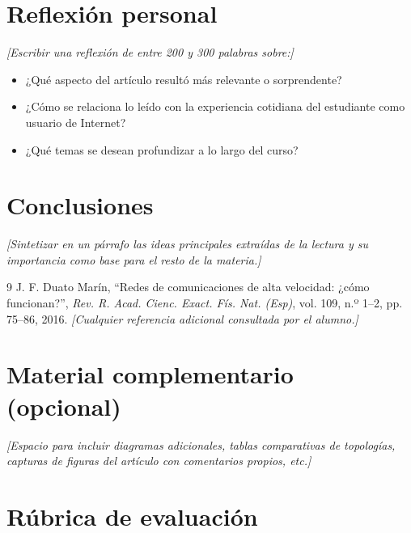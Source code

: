\documentclass[12pt,a4paper]{article}
\begin{document}
\section{Reflexión personal}
\textit{[Escribir una reflexión de entre 200 y 300 palabras sobre:]}
\begin{itemize}
    \item ¿Qué aspecto del artículo resultó más relevante o sorprendente?
    \item ¿Cómo se relaciona lo leído con la experiencia cotidiana del estudiante como usuario de Internet?
    \item ¿Qué temas se desean profundizar a lo largo del curso?
\end{itemize}

\section{Conclusiones}
\textit{[Sintetizar en un párrafo las ideas principales extraídas de la lectura y su importancia como base para el resto de la materia.]}

\begin{thebibliography}{9}
    J. F. Duato Marín, ``Redes de comunicaciones de alta velocidad: ¿cómo funcionan?'', \textit{Rev. R. Acad. Cienc. Exact. Fís. Nat. (Esp)}, vol. 109, n.º 1--2, pp. 75--86, 2016.
    \textit{[Cualquier referencia adicional consultada por el alumno.]}
\end{thebibliography}

\appendix
\section{Material complementario (opcional)}
\textit{[Espacio para incluir diagramas adicionales, tablas comparativas de topologías, capturas de figuras del artículo con comentarios propios, etc.]}

\newpage
\section*{Rúbrica de evaluación}
\end{document}
